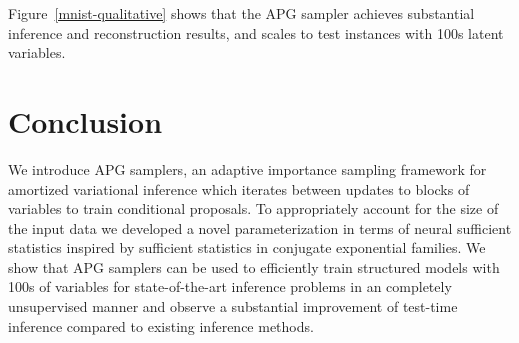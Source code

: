\documentclass{article}
\theoremstyle{definition}
\begin{document}
Figure~\ref{mnist-qualitative} shows that the APG sampler achieves substantial inference and reconstruction results, and scales to test instances with 100s latent variables.


\vspace{-1.0em}
\section{Conclusion}
We introduce APG samplers, an adaptive importance sampling framework for amortized variational inference which iterates between updates to blocks of variables to train conditional proposals. To appropriately account for the size of the input data we developed a novel parameterization in terms of neural sufficient statistics inspired by sufficient statistics in conjugate exponential families.
We show that APG samplers can be used to efficiently train structured models with 100s of variables for state-of-the-art inference problems in an completely unsupervised manner and observe a substantial improvement of test-time inference compared to existing inference methods.


\end{document}
